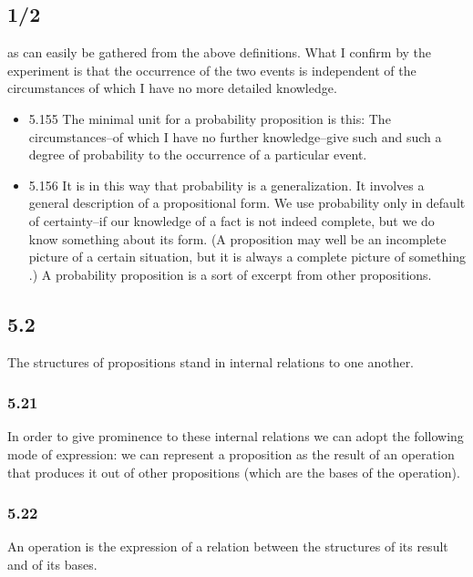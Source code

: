 \documentclass[11pt]{article}
\begin{document}
\subsection*{1/2}
\label{sec:org7a232b8}
as can easily be gathered from the above definitions. What I confirm by
the experiment is that the occurrence of the two events is independent of
the circumstances of which I have no more detailed knowledge.
\begin{itemize}
\item 5.155
\label{sec:orgc223ff8}
The minimal unit for a probability proposition is this: The
circumstances--of which I have no further knowledge--give such and such a
degree of probability to the occurrence of a particular event.
\item 5.156
\label{sec:org28cbe9e}
It is in this way that probability is a generalization. It involves a
general description of a propositional form. We use probability only in
default of certainty--if our knowledge of a fact is not indeed complete,
but we do know something about its form. (A proposition may well be an
incomplete picture of a certain situation, but it is always a complete
picture of something .) A probability proposition is a sort of excerpt from
other propositions.
\end{itemize}
\subsection*{5.2}
\label{sec:orgf5f0a58}
The structures of propositions stand in internal relations to one
another.
\subsubsection*{5.21}
\label{sec:orgdb8d0e3}
In order to give prominence to these internal relations we can adopt
the following mode of expression: we can represent a proposition as the
result of an operation that produces it out of other propositions (which
are the bases of the operation).
\subsubsection*{5.22}
\label{sec:org83721fa}
An operation is the expression of a relation between the structures of
its result and of its bases.
\end{document}
